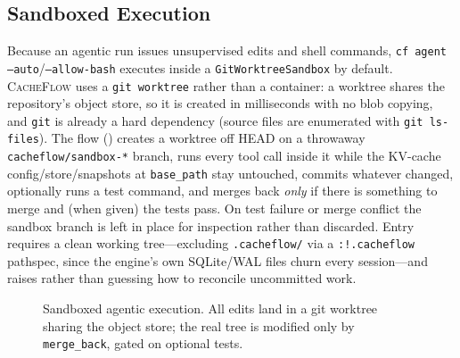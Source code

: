 \documentclass[10pt]{article}
\begin{document}
\subsection{Sandboxed Execution}
\label{sec:sandbox}
Because an agentic run issues unsupervised edits and shell commands, \texttt{cf
agent --auto}/\texttt{--allow-bash} executes inside a \texttt{GitWorktreeSandbox}
by default. \textsc{CacheFlow} uses a \texttt{git worktree} rather than a
container: a worktree shares the repository's object store, so it is created in
milliseconds with no blob copying, and \texttt{git} is already a hard dependency
(source files are enumerated with \texttt{git ls-files}). The flow ()
creates a worktree off HEAD on a throwaway \texttt{cacheflow/sandbox-*} branch,
runs every tool call inside it while the KV-cache config/store/snapshots at
\texttt{base\_path} stay untouched, commits whatever changed, optionally runs a
test command, and merges back \emph{only} if there is something to merge and
(when given) the tests pass. On test failure or merge conflict the sandbox branch
is left in place for inspection rather than discarded. Entry requires a clean
working tree---excluding \texttt{.cacheflow/} via a \texttt{:!.cacheflow}
pathspec, since the engine's own SQLite/WAL files churn every session---and
raises rather than guessing how to reconcile uncommitted work.

\begin{figure}[t]
\centering
{}
\caption{Sandboxed agentic execution. All edits land in a git worktree sharing
the object store; the real tree is modified only by \texttt{merge\_back}, gated on
optional tests.}
\label{fig:sandbox}
\end{figure}
\end{document}
